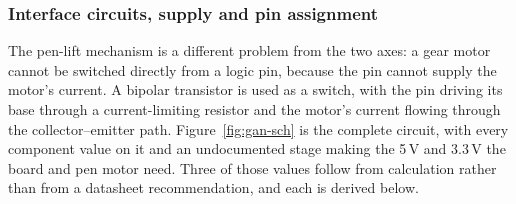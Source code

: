 \subsubsection{Interface circuits, supply and pin assignment}
\label{sec:gan-circuits}

The pen-lift mechanism is a different problem from the two axes: a gear motor cannot be switched directly from a logic pin, because the pin cannot supply the motor's current. A bipolar transistor is used as a switch, with the pin driving its base through a current-limiting resistor and the motor's current flowing through the collector--emitter path. Figure~\ref{fig:gan-sch} is the complete circuit, with every component value on it and an undocumented stage making the 5\,V and 3.3\,V the board and pen motor need. Three of those values follow from calculation rather than from a datasheet recommendation, and each is derived below.


